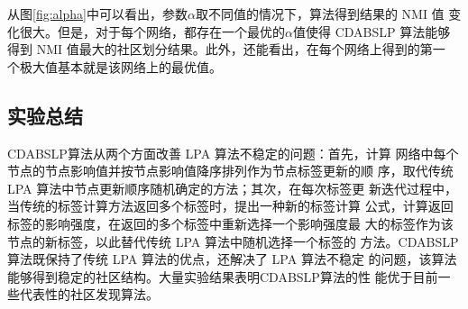 从图\ref{fig:alpha}中可以看出，参数$\alpha$取不同值的情况下，算法得到结果的 NMI 值
变化很大。但是，对于每个网络，都存在一个最优的$\alpha$值使得 CDABSLP 算法能够
得到 NMI 值最大的社区划分结果。此外，还能看出，在每个网络上得到的第一
个极大值基本就是该网络上的最优值。

\subsection{实验总结}

CDABSLP算法从两个方面改善 LPA 算法不稳定的问题：首先，计算
网络中每个节点的节点影响值并按节点影响值降序排列作为节点标签更新的顺
序，取代传统 LPA 算法中节点更新顺序随机确定的方法；其次，在每次标签更
新迭代过程中，当传统的标签计算方法返回多个标签时，提出一种新的标签计算
公式，计算返回标签的影响强度，在返回的多个标签中重新选择一个影响强度最
大的标签作为该节点的新标签，以此替代传统 LPA 算法中随机选择一个标签的
方法。CDABSLP算法既保持了传统 LPA 算法的优点，还解决了 LPA 算法不稳定
的问题，该算法能够得到稳定的社区结构。大量实验结果表明CDABSLP算法的性
能优于目前一些代表性的社区发现算法。 
